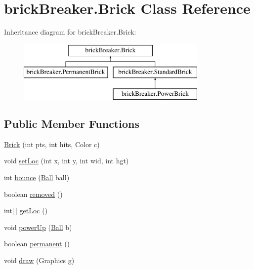 \hypertarget{classbrick_breaker_1_1_brick}{
\section{brickBreaker.Brick Class Reference}
\label{classbrick_breaker_1_1_brick}
}
Inheritance diagram for brickBreaker.Brick:\begin{figure}[H]
\begin{center}
\leavevmode
\includegraphics[height=3cm]{classbrick_breaker_1_1_brick}
\end{center}
\end{figure}
\subsection*{Public Member Functions}
\begin{DoxyCompactItemize}
\item 
\hyperlink{classbrick_breaker_1_1_brick_a48498f7c136cce1f0742ec4406ac2831}{Brick} (int pts, int hits, Color c)
\item 
void \hyperlink{classbrick_breaker_1_1_brick_a6f9ff21504eab68a2b9b9e6a87ed0f52}{setLoc} (int x, int y, int wid, int hgt)
\item 
int \hyperlink{classbrick_breaker_1_1_brick_a8b7ce8ba47ffe6de06c0c6121cdaa231}{bounce} (\hyperlink{classbrick_breaker_1_1_ball}{Ball} ball)
\item 
boolean \hyperlink{classbrick_breaker_1_1_brick_ac333dcbd252242dc78ece37b8a661ce0}{removed} ()
\item 
int\mbox{[}$\,$\mbox{]} \hyperlink{classbrick_breaker_1_1_brick_afb94388b2aac0dd371265db241fddbcf}{getLoc} ()
\item 
void \hyperlink{classbrick_breaker_1_1_brick_a109d6d8023e528284c1726ee55c3e50e}{powerUp} (\hyperlink{classbrick_breaker_1_1_ball}{Ball} b)
\item 
boolean \hyperlink{classbrick_breaker_1_1_brick_a5fa03da94163b3dc3707c030e85a1405}{permanent} ()
\item 
void \hyperlink{classbrick_breaker_1_1_brick_afe45c6bf60b36b267eeb3a8bb978d06c}{draw} (Graphics g)
\end{DoxyCompactItemize}



